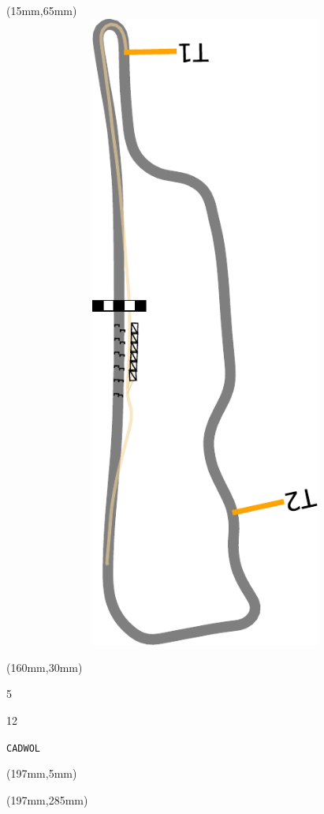 \begin{textblock*}{185mm}(15mm,65mm)%
\centering
\mbox{\includegraphics[width=185mm,height=210mm,keepaspectratio]{PT/CADWOL.pdf}}
\end{textblock*}
\begin{textblock*}{40mm}(160mm,30mm)%
\Large
\par{} 
\par5 
\par12 
\par\hfill\tiny\tt CADWOL\\
\end{textblock*}
\begin{textblock*}{20mm}(197mm,5mm)%
\fbox{\thepage}
\label{CADWOL}
\end{textblock*}
\begin{textblock*}{20mm}(197mm,285mm)%
\fbox{\thepage}
\end{textblock*}

